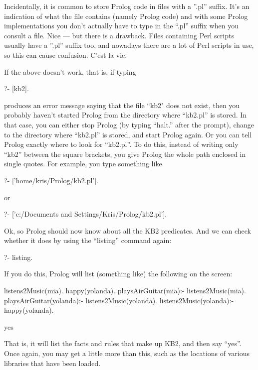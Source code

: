 Incidentally, it is common to store Prolog code in files with a
''.pl'' suffix. It's an indication of what the file contains (namely
Prolog code) and with some Prolog implementations you don't actually
have to type in the ``.pl'' suffix when you consult a file.  Nice ---
but there is a drawback. Files containing Perl scripts usually have a
''.pl'' suffix too, and nowadays there are a lot of Perl scripts in use,
so this can cause confusion. C'est la vie.

If the above doesn't work, that is, if typing
\begin{LPNcodedisplay}
?- [kb2].
\end{LPNcodedisplay}
produces an error message saying that the file ``kb2"
does not exist, then you probably haven't started Prolog from the
directory where ``kb2.pl'' is stored. In that case, you can either stop
Prolog (by typing ``halt.'' after the prompt), change to the directory
where ``kb2.pl'' is stored, and start Prolog again. Or you can tell
Prolog exactly where to look for ``kb2.pl''. To do this, instead of
writing only ``kb2'' between the square brackets, you give Prolog the
whole path enclosed in single quotes. For example, you type something
like
\begin{LPNcodedisplay}
?- ['home/kris/Prolog/kb2.pl'].
\end{LPNcodedisplay}

or
\begin{LPNcodedisplay}
?- ['c:/Documents and Settings/Kris/Prolog/kb2.pl'].
\end{LPNcodedisplay}


Ok, so Prolog should now know about all the KB2 predicates. And we can
check whether it does by using the ``listing'' command again:
%
\begin{LPNcodedisplay}
?- listing.
\end{LPNcodedisplay}
%
If you do this, Prolog will list (something like) the following on the
screen:
%
\begin{LPNcodedisplay}
listens2Music(mia).
happy(yolanda).
playsAirGuitar(mia):-
   listens2Music(mia).
playsAirGuitar(yolanda):-
   listens2Music(yolanda).
listens2Music(yolanda):-
   happy(yolanda).

yes
\end{LPNcodedisplay}
That is, it will list the facts and rules that make up KB2, and then
say ``yes''. Once again, you may get a little more than this, such as
the locations of various libraries that have been loaded.

